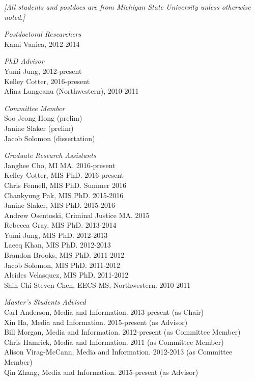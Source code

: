 \documentclass[9pt]{extarticle}
\begin{document}
\vspace{-5pt}
\footnotesize
\emph{[All students and postdocs are from Michigan State University unless otherwise noted.]\\}
\normalsize
\vspace{5pt}

\emph{Postdoctoral Researchers} \\
Kami Vaniea, 2012-2014

\emph{PhD Advisor} \\
Yumi Jung, 2012-present \\
Kelley Cotter, 2016-present \\
Alina Lungeanu (Northwestern), 2010-2011

\emph{Committee Member} \\
Soo Jeong Hong (prelim) \\
Janine Slaker (prelim) \\
Jacob Solomon (dissertation)

\emph{Graduate Research Assistants} \\
Janghee Cho, MI MA. 2016-present \\
Kelley Cotter, MIS PhD. 2016-present \\
Chris Fennell, MIS PhD. Summer 2016 \\
Chankyung Pak, MIS PhD. 2015-2016 \\
Janine Slaker, MIS PhD. 2015-2016 \\
Andrew Osentoski, Criminal Justice MA. 2015 \\
Rebecca Gray, MIS PhD. 2013-2014 \\
Yumi Jung, MIS PhD. 2012-2013 \\
Laeeq Khan, MIS PhD. 2012-2013 \\
Brandon Brooks, MIS PhD. 2011-2012 \\
Jacob Solomon, MIS PhD. 2011-2012 \\
Alcides Velasquez, MIS PhD. 2011-2012 \\
Shih-Chi Steven Chen, EECS MS, Northwestern. 2010-2011

\emph{Master's Students Advised} \\
Carl Anderson, Media and Information. 2013-present (as Chair) \\
Xin Ha, Media and Information. 2015-present (as Advisor) \\
Bill Morgan, Media and Information. 2012-present (as Committee Member) \\
Chris Hamrick, Media and Information. 2011 (as Committee Member) \\
Alison Virag-McCann, Media and Information. 2012-2013 (as Committee Member) \\
Qin Zhang, Media and Information. 2015-present (as Advisor)
\end{document}
